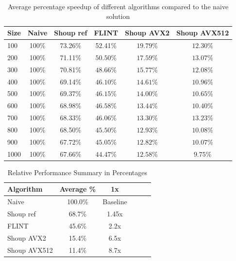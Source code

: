 \documentclass{article}
\begin{document}
\begin{table}[H]
    \centering
    \caption{Average percentage speedup of different algorithms compared to the naive solution}
    \begin{tabular}{|l|c|c|c|c|c|}
        \hline
        Size & Naive & Shoup ref & FLINT     & Shoup AVX2 & Shoup AVX512 \\ \hline
        100  & 100\% & 73.26\%   & 52.41\%   & $19.79\%$  & $12.30\%$    \\
        200  & 100\% & 71.11\%   & $50.50\%$ & $17.59\%$  & $13.07\%$    \\
        300  & 100\% & 70.81\%   & $48.66\%$ & $15.77\%$  & $12.08\%$    \\
        400  & 100\% & 69.14\%   & $46.10\%$ & $14.61\%$  & $10.96\%$    \\
        500  & 100\% & 69.37\%   & $46.15\%$ & $14.00\%$  & $10.65\%$    \\
        600  & 100\% & 68.98\%   & $46.58\%$ & $13.44\%$  & $10.40\%$    \\
        700  & 100\% & 68.33\%   & $46.06\%$ & $13.30\%$  & $13.23\%$    \\
        800  & 100\% & 68.50\%   & $45.50\%$ & $12.93\%$  & $10.08\%$    \\
        900  & 100\% & 67.72\%   & $45.05\%$ & $12.82\%$  & $10.07\%$    \\
        1000 & 100\% & 67.66\%   & $44.47\%$ & $12.58\%$  & $9.75\%$     \\
        \hline
    \end{tabular}
\end{table}

\begin{table}[H]
    \centering
    \caption{Relative Performance Summary in Percentages}
    \begin{tabular}{|l|c|c|c|c|c|}
        \hline
        Algorithm    & Average \% & 1x       \\ \hline
        Naive        & 100.0\%    & Baseline \\
        Shoup ref    & 68.7\%     & 1.45x    \\
        FLINT        & 45.6\%     & 2.2x     \\
        Shoup AVX2   & 15.4\%     & 6.5x     \\
        Shoup AVX512 & 11.4\%     & 8.7x     \\
        \hline
    \end{tabular}
\end{table}
\end{document}
